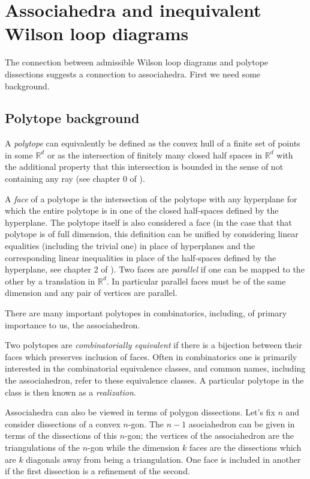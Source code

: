 \documentclass[11pt]{article}
\newcommand{\sanote}{\todo[color=violet!30]}
\theoremstyle{remark}
\theoremstyle{definition}
\begin{document}
\section{Associahedra and inequivalent Wilson loop diagrams}\label{sec associahedron}

The connection between admissible Wilson loop diagrams and polytope dissections suggests a connection to associahedra. First we need some background. \sanote{expand}

\subsection{Polytope background}\label{sec polytope background}

A \emph{polytope} can equivalently be defined as the convex hull of a finite set of points in some $\mathbb{R}^d$ or as the intersection of finitely many closed half spaces in $\mathbb{R}^d$ with the additional property that this intersection is bounded in the sense of not containing any ray (see chapter 0 of \cite{Ziegler}).

A \emph{face} of a polytope is the intersection of the polytope with any hyperplane for which the entire polytope is in one of the closed half-spaces defined by the hyperplane.  The polytope itself is also considered a face (in the case that that polytope is of full dimension, this definition can be unified by considering linear equalities (including the trivial one) in place of hyperplanes and the corresponding linear inequalities in place of the half-spaces defined by the hyperplane, see chapter 2 of \cite{Ziegler}).  Two faces are \emph{parallel} if one can be mapped to the other by a translation in $\mathbb{R}^d$.  In particular parallel faces must be of the same dimension and any pair of vertices are parallel.

There are many important polytopes in combinatorics, including, of primary importance to us, the associahedron.

Two polytopes are \emph{combinatorially equivalent} if there is a bijection between their faces which preserves inclusion of faces.  Often in combinatorics one is primarily interested in the combinatorial equivalence classes, and common names, including the associahedron, refer to these equivalence classes.  A particular polytope in the class is then known as a \emph{realization}.  

Associahedra can also be viewed in terms of polygon dissections.  Let's fix $n$ and consider dissections of a convex $n$-gon.  The $n-1$ asociahedron can be given in terms of the dissections of this $n$-gon; the vertices of the associahedron are the triangulations of the $n$-gon while the dimension $k$ faces are the dissections which are $k$ diagonals away from being a triangulation.  One face is included in another if the first dissection is a refinement of the second. 
\end{document}
